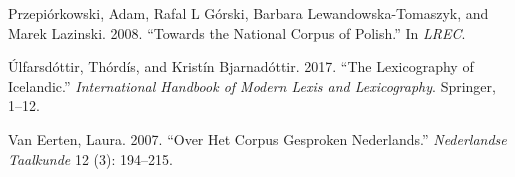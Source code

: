 \documentclass[]{article}
\begin{document}
\hypertarget{ref-przepiorkowski2008towards}{}
Przepiórkowski, Adam, Rafal L Górski, Barbara Lewandowska-Tomaszyk, and
Marek Lazinski. 2008. ``Towards the National Corpus of Polish.'' In
\emph{LREC}.

\hypertarget{ref-ulfarsdottir2017lexicography}{}
Úlfarsdóttir, Thórdís, and Kristín Bjarnadóttir. 2017. ``The
Lexicography of Icelandic.'' \emph{International Handbook of Modern
Lexis and Lexicography}. Springer, 1--12.

\hypertarget{ref-van2007over}{}
Van Eerten, Laura. 2007. ``Over Het Corpus Gesproken Nederlands.''
\emph{Nederlandse Taalkunde} 12 (3): 194--215.
\end{document}
